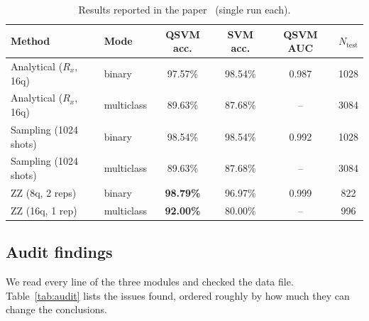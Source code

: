 \begin{table}[H]
\centering\small
\caption{Results reported in the paper~\cite{ourpaper} (single run each).}
\label{tab:paper}
\begin{tabular}{llccc c}
\toprule
Method & Mode & QSVM acc. & SVM acc. & QSVM AUC & $N_\text{test}$ \\
\midrule
Analytical ($R_x$, 16q) & binary & 97.57\% & 98.54\% & 0.987 & 1028 \\
Analytical ($R_x$, 16q) & multiclass & 89.63\% & 87.68\% & -- & 3084 \\
Sampling (1024 shots)   & binary & 98.54\% & 98.54\% & 0.992 & 1028 \\
Sampling (1024 shots)   & multiclass & 89.63\% & 87.68\% & -- & 3084 \\
ZZ (8q, 2 reps)         & binary & \textbf{98.79\%} & 96.97\% & 0.999 & 822 \\
ZZ (16q, 1 rep)         & multiclass & \textbf{92.00\%} & 80.00\% & -- & 996 \\
\bottomrule
\end{tabular}
\end{table}

\subsection{Audit findings}
We read every line of the three modules and checked the data file. Table~\ref{tab:audit} lists
the issues found, ordered roughly by how much they can change the conclusions.

